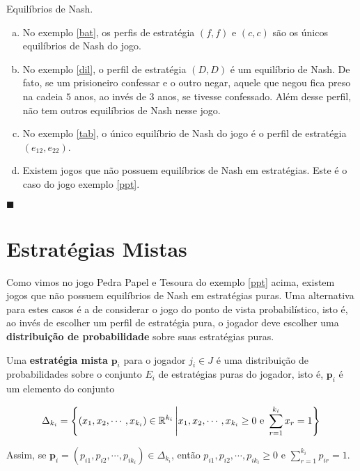 \begin{ex} Equilíbrios de Nash.

\begin{enumerate}[a)]
\item No exemplo \ref{bat}, os perfis de estratégia $(f,f)$ e $(c,c)$ são os únicos equilíbrios de Nash do jogo.
\item No exemplo \ref{dil}, o perfil de estratégia $(D,D)$ é um equilíbrio de Nash. De fato, se um prisioneiro confessar
e o outro negar, aquele que negou fica preso na cadeia $5$ anos, ao invés de $3$ anos, se tivesse confessado. Além desse perfil, não tem outros equilíbrios de Nash nesse jogo.
\item No exemplo \ref{tab}, o único equilíbrio de Nash do jogo é o perfil de estratégia $(e_{12},e_{22})$.
\item Existem jogos que não possuem equilíbrios de Nash em estratégias. Este é o caso do jogo exemplo \ref{ppt}.
\end{enumerate}\hfill$\blacksquare$

\end{ex}

\section{Estratégias Mistas}

Como vimos no jogo Pedra Papel e Tesoura do exemplo \ref{ppt} acima, existem jogos que não possuem equilíbrios de Nash em estratégias puras. Uma alternativa para estes casos é a de considerar o jogo do ponto de vista probabilístico, isto é, ao invés de escolher um perfil de estratégia pura, o jogador deve escolher uma \textbf{distribuição de probabilidade} sobre suas estratégias puras.

Uma \textbf{estratégia mista} $\textbf{p}_i$ para o jogador $j_i \in J$ é uma distribuição de probabilidades sobre o conjunto $E_i$ de estratégias puras do jogador, isto é, $\textbf{p}_i$ é um elemento do conjunto

\begin{equation}\nonumber
\Delta_{k_i}=\left\{\left(x_1,x_2,\cdots,x_{k_i}\right)\in\mathbb{R}^{k_i}\left|x_1,x_2,\cdots,x_{k_i}\geq0\text{ e } \sum_{r=1}^{k_i}{x_r}=1\right\}\right.
\end{equation}\vspace{0.1cm}

Assim, se $\textbf{p}_i=(p_{i1}, p_{i2},\cdots,p_{ik_i})\in\Delta_{k_i}$, então $p_{i1}, p_{i2},\cdots,p_{ik_i}\geq0$ e $\displaystyle\sum_{r=1}^{k_i}{p_{ir}}=1$.

